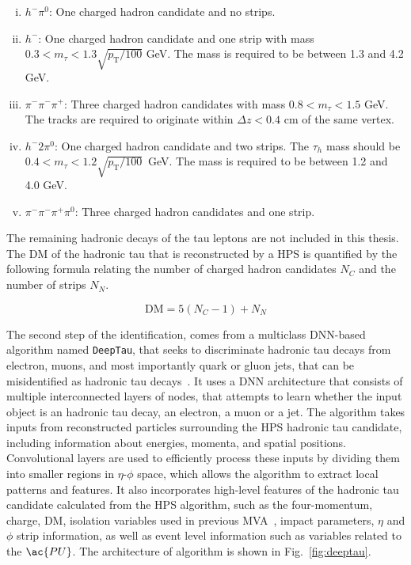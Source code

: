 \begin{enumerate}[i)]
\item $h^- \pi^0$: One charged hadron candidate and no strips.
\item $h^-$: One charged hadron candidate and one strip with mass $ 0.3 < m_{\tau} < 1.3 \sqrt{p_{\text{T}}/100}$ GeV. The mass is required to be between 1.3 and 4.2 GeV.
\item $\pi^- \pi^- \pi^+$: Three charged hadron candidates with mass $0.8 < m_{\tau} < 1.5$ GeV. The tracks are required to originate within $\Delta z<0.4$ cm of the same vertex.
\item $h^- 2\pi^0$: One charged hadron candidate and two strips. The $\tau_{h}$ mass should be $0.4 < m_{\tau} < 1.2\sqrt{p_{\text{T}}/100}$~GeV. The mass is required to be between 1.2 and 4.0 GeV.
\item $\pi^- \pi^- \pi^+ \pi^0$: Three charged hadron candidates and one strip.
\end{enumerate}

The remaining hadronic decays of the tau leptons are not included in this thesis.
The \ac{DM} of the hadronic tau that is reconstructed by a \ac{HPS} is quantified by the following formula relating the number of charged hadron candidates $N_C$ and the number of strips $N_N$.

\begin{equation}
\text{DM} = 5(N_{C} - 1) + N_{N}
\end{equation}

The second step of the identification, comes from a multiclass \ac{DNN}-based algorithm named \texttt{DeepTau}, that seeks to discriminate hadronic tau decays from electron, muons, and most importantly quark or gluon jets, that can be misidentified as hadronic tau decays~\cite{CMS:2022prd}.
It uses a \ac{DNN} architecture that consists of multiple interconnected layers of nodes, that attempts to learn whether the input object is an hadronic tau decay, an electron, a muon or a jet. 
The algorithm takes inputs from reconstructed particles surrounding the \ac{HPS} hadronic tau candidate, including information about energies, momenta, and spatial positions. 
Convolutional layers are used to efficiently process these inputs by dividing them into smaller regions in $\eta$-$\phi$ space, which allows the algorithm to extract local patterns and features. 
It also incorporates high-level features of the hadronic tau candidate calculated from the \ac{HPS} algorithm, such as the four-momentum, charge, \ac{DM}, isolation variables used in previous \ac{MVA}~\cite{CMS:2018jrd}, impact parameters, $\eta$ and $\phi$ strip information, as well as event level information such as variables related to the $\ac{PU}$.
The architecture of algorithm is shown in Fig.~\ref{fig:deeptau}. \\

